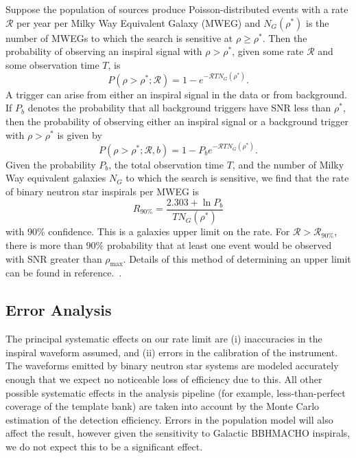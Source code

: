 Suppose the population of sources produce Poisson-distributed events with
a rate $\mathcal{R}$ per year per Milky Way Equivalent Galaxy
(MWEG) and $N_G(\rho^\ast)$ is the
number of MWEGs to which the search is sensitive at $\rho \geq
\rho^\ast$.   Then the
probability of observing an inspiral signal with $\rho > \rho^\ast$,
given some rate $\mathcal{R}$ and some observation time $T$, is
\begin{equation}
  P(\rho>\rho^\ast;{\mathcal{R}}) = 1 - e^{-{\mathcal{R}}T N_G(\rho^\ast)}.
  \label{e:foreground-poisson}
\end{equation}
A trigger can arise from either an inspiral signal in the data or from
background.   If $P_b$ denotes the probability that all background triggers
have SNR less than $\rho^\ast$,  then the probability of observing
either an inspiral signal or a background trigger with $\rho > \rho^\ast$ 
is given by
\begin{equation}
  P(\rho>\rho^\ast;{\mathcal{R}},b) = 1 - P_b e^{-{\mathcal{R}}TN_G(\rho^\ast)}.
  \label{e:joint-dist}
\end{equation}
Given the
probability $P_b$, the total observation time $T$, and the number of Milky Way
equivalent galaxies $N_{{G}}$ to which the search is sensitive, we find that the 
rate of binary neutron star inspirals per MWEG is
\begin{equation}
  R_{90\%} = \frac{2.303+\ln P_b}{T N_{G}(\rho^\ast)}
\end{equation}
with 90\% confidence.  This is a galaxies upper limit on the rate.
For ${\mathcal{R}}>{\mathcal{R}}_{90\%}$, there is more than $90\%$
probability that at least one event would be observed with SNR greater
than $\rho_{\text{max}}$.   Details of this method of determining an 
upper limit can be found in reference.~\cite{loudestGWDAW03}.


\subsection{Error Analysis}
\label{ss:errors}

The principal systematic effects on our rate limit are (i) inaccuracies in the
inspiral waveform assumed, and (ii) errors in the calibration of the
instrument.  The waveforms emitted by binary neutron star systems are modeled
accurately enough that we expect no noticeable loss of efficiency due to this.
All other possible systematic effects in the analysis pipeline (for example,
less-than-perfect coverage of the template bank) are taken into account by the
Monte Carlo estimation of the detection efficiency.  Errors in the population
model will also affect the result, however given the sensitivity to Galactic
BBHMACHO inspirals, we do not expect this to be a significant effect.

